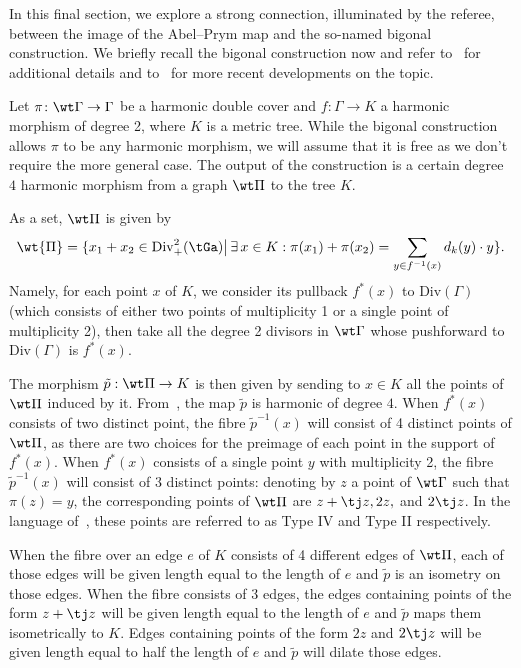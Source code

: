 In this final section, we explore a strong connection, illuminated by the referee, between the image of the Abel--Prym map and the so-named bigonal construction.
We briefly recall the bigonal construction now and  refer to~\cite{RZ_ngonal} for additional details and to~\cite{Zakharov_Trigonal, RohrleSaillez_Donagi} for more recent developments on the topic.


Let $\pi\colon \wt\Gamma\to \Gamma$ be a harmonic double cover and $f\colon \Gamma \to K$
a harmonic morphism of degree 2, where $K$ is a metric tree. While the bigonal construction allows $\pi$ to be any harmonic morphism,  we will assume that it is free as we don't require the more general case. 
The output of the construction
 is a certain degree $4$ harmonic morphism from a graph $\wt\Pi$ to the tree $K$. 

 
As a set, $\wt \Pi$  is
given by
\[
\wt{\Pi}=\{x_1+x_2\in \mathrm{Div}^2_+(\tGa)\big|\,\exists\, x\in K : \pi(x_1)+\pi(x_2)=\sum_{y\in f^{-1}(x)}d_k(y)\cdot y\}.
\]
Namely, for each point $x$ of $K$, we consider its pullback $f^*(x)$ to $\mathrm{Div}(\Gamma)$ (which consists of either two points of multiplicity 1 or a single point of multiplicity 2), then take all the degree 2 divisors in $\wt\Gamma$ whose pushforward to $\mathrm{Div}(\Gamma)$ is $f^*(x)$. 


The morphism $\tilde p:\wt \Pi\to K$ is then given by sending to $x\in K$ all the points of $\wt \Pi$ induced by it. 
From~\cite[Proposition 2.1]{RZ_ngonal}, the map $\tilde p$ is harmonic of degree $4$. When $f^*(x)$ consists of two distinct point, the fibre $\tilde p^{-1}(x)$ will consist of 4 distinct points of $\wt \Pi$, as there are two choices for the preimage of each point in the support of $f^*(x)$.  
When  $f^*(x)$ consists of a single point $y$ with multiplicity 2, the fibre $\tilde p^{-1}(x)$ will consist of $3$ distinct points:  denoting by $z$ a point of $\wt\Gamma$ such that $\pi(z) = y$,  the corresponding points of $\wt \Pi$ are $z+\tj z, 2z,$ and $2\tj z$. In the language of~\cite{RZ_ngonal}, these points are referred to as Type IV and Type II respectively. 

When the fibre over an edge $e$ of $K$ consists of 4 different edges of $\wt \Pi$, each of those edges will be given length equal to the length of $e$ and $\tilde p$ is an isometry on those edges. When the fibre consists of 3 edges, the edges containing points of the form $z+\tj z$ will be  given length equal to the length of $e$ and $\tilde p$ maps them isometrically to $K$. 
Edges containing points of the form 
$2z$ and $2\tj z$ will be given  length equal to half the length of $e$ and $\tilde p$ will dilate those edges. 

